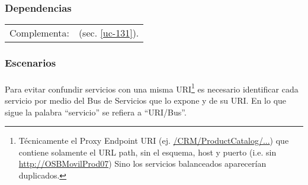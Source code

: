 \subsubsection*{Dependencias}
\begin{tabular}{lp{}}
    Complementa: & \ucCXxxiFullName{} (sec. \ref{uc-131}). \\
\end{tabular}




\subsubsection*{Escenarios}
\paragraph{}
Para evitar confundir servicios con una misma URI\footnote{
    T\'ecnicamente el Proxy Endpoint URI (ej. \url{/CRM/ProductCatalog/...})
    que contiene solamente el URL path,
    sin el esquema, host y puerto (i.e. sin \url{http://OSBMovilProd07})
    Sino los servicios balanceados aparecer\'ian duplicados.
}
es necesario identificar cada servicio por medio del Bus de Servicios que lo expone
y de su URI. 
En lo que sigue la palabra ``servicio'' se refiera a ``URI/Bus''.

